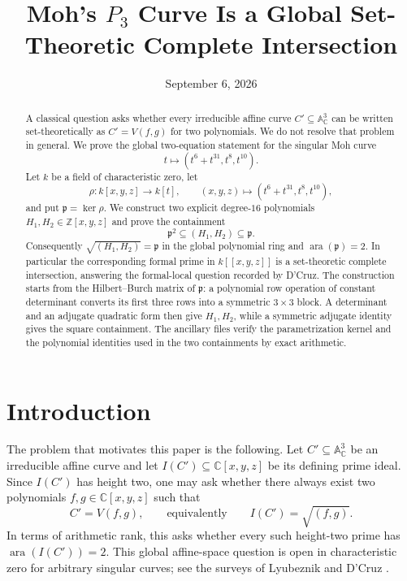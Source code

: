 \documentclass[11pt]{amsart}
\title{Moh's $P_3$ Curve Is a Global Set-Theoretic Complete Intersection}
\date{September 6, 2026}
\theoremstyle{remark}
\DeclareMathOperator{\ara}{ara}
\begin{document}
\begin{abstract}
A classical question asks whether every irreducible affine curve $C'\subseteq\mathbb A^3_{\mathbb C}$ can be written set-theoretically as $C'=V(f,g)$ for two polynomials.  We do not resolve that problem in general.  We prove the global two-equation statement for the singular Moh curve
\[
 t\longmapsto (t^6+t^{31},t^8,t^{10}).
\]
Let $k$ be a field of characteristic zero, let
\[
 \rho:k[x,y,z]\longrightarrow k[t],\qquad
 (x,y,z)\longmapsto(t^6+t^{31},t^8,t^{10}),
\]
and put $\mathfrak p=\ker\rho$.  We construct two explicit degree-$16$ polynomials $H_1,H_2\in\mathbb Z[x,y,z]$ and prove the containment
\[
 \mathfrak p^2\subseteq(H_1,H_2)\subseteq\mathfrak p.
\]
Consequently $\sqrt{(H_1,H_2)}=\mathfrak p$ in the global polynomial ring and $\ara(\mathfrak p)=2$.  In particular the corresponding formal prime in $k[[x,y,z]]$ is a set-theoretic complete intersection, answering the formal-local question recorded by D'Cruz.  The construction starts from the Hilbert--Burch matrix of $\mathfrak p$: a polynomial row operation of constant determinant converts its first three rows into a symmetric $3\times3$ block.  A determinant and an adjugate quadratic form then give $H_1,H_2$, while a symmetric adjugate identity gives the square containment.  The ancillary files verify the parametrization kernel and the polynomial identities used in the two containments by exact arithmetic.
\end{abstract}

\maketitle

\section{Introduction}
The problem that motivates this paper is the following.  Let $C'\subseteq\mathbb A^3_{\mathbb C}$ be an irreducible affine curve and let $I(C')\subseteq\mathbb C[x,y,z]$ be its defining prime ideal.  Since $I(C')$ has height two, one may ask whether there always exist two polynomials $f,g\in\mathbb C[x,y,z]$ such that
\[
 C'=V(f,g),\qquad\text{equivalently}\qquad I(C')=\sqrt{(f,g)}.
\]
In terms of arithmetic rank, this asks whether every such height-two prime has $\ara(I(C'))=2$.  This global affine-space question is open in characteristic zero for arbitrary singular curves; see the surveys of Lyubeznik and D'Cruz \cite{Lyubeznik1989,Lyubeznik1992,DCruz2020}.
\end{document}
